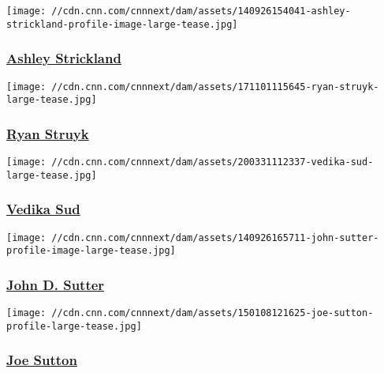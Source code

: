 \href{/profiles/ashley-strickland-profile}{}

\texttt{[image: //cdn.cnn.com/cnnnext/dam/assets/140926154041-ashley-strickland-profile-image-large-tease.jpg]}

\hypertarget{ashley-strickland}{%
\subsubsection{\texorpdfstring{\href{/profiles/ashley-strickland-profile}{Ashley
Strickland}}{Ashley Strickland}}\label{ashley-strickland}}

\href{/profiles/ryan-struyk}{}

\texttt{[image: //cdn.cnn.com/cnnnext/dam/assets/171101115645-ryan-struyk-large-tease.jpg]}

\hypertarget{ryan-struyk}{%
\subsubsection{\texorpdfstring{\href{/profiles/ryan-struyk}{Ryan
Struyk}}{Ryan Struyk}}\label{ryan-struyk}}

\href{/profiles/vedika-sud}{}

\texttt{[image: //cdn.cnn.com/cnnnext/dam/assets/200331112337-vedika-sud-large-tease.jpg]}

\hypertarget{vedika-sud}{%
\subsubsection{\texorpdfstring{\href{/profiles/vedika-sud}{Vedika
Sud}}{Vedika Sud}}\label{vedika-sud}}

\href{/profiles/john-d-sutter}{}

\texttt{[image: //cdn.cnn.com/cnnnext/dam/assets/140926165711-john-sutter-profile-image-large-tease.jpg]}

\hypertarget{john-d-sutter}{%
\subsubsection{\texorpdfstring{\href{/profiles/john-d-sutter}{John D.
Sutter}}{John D. Sutter}}\label{john-d-sutter}}

\href{/profiles/joe-sutton}{}

\texttt{[image: //cdn.cnn.com/cnnnext/dam/assets/150108121625-joe-sutton-profile-large-tease.jpg]}

\hypertarget{joe-sutton}{%
\subsubsection{\texorpdfstring{\href{/profiles/joe-sutton}{Joe
Sutton}}{Joe Sutton}}\label{joe-sutton}}

